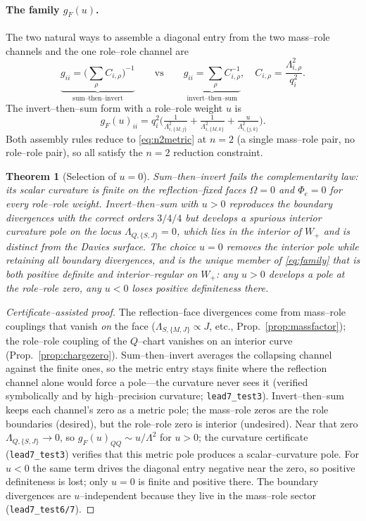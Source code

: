 \documentclass[11pt]{article}
\newtheorem{theorem}{Theorem}
\newcommand{\Wp}{W_{+}}
\begin{document}
\paragraph{The family $g_F(u)$.}
The two natural ways to assemble a diagonal entry from the two mass--role channels and the one
role--role channel are
\[
\underbrace{g_{ii}=\Big(\textstyle\sum_\rho C_{i,\rho}\Big)^{-1}}_{\text{sum--then--invert}}
\qquad\text{vs}\qquad
\underbrace{g_{ii}=\textstyle\sum_\rho C_{i,\rho}^{-1}}_{\text{invert--then--sum}},
\quad C_{i,\rho}=\frac{\Lambda_{i,\rho}^2}{q_i^2}.
\]
The invert--then--sum form with a role--role weight $u$ is
\begin{equation}
g_F(u)_{ii}=q_i^2\Big(\tfrac1{\Lambda_{i,\{M,j\}}^2}+\tfrac1{\Lambda_{i,\{M,k\}}^2}
+\tfrac{u}{\Lambda_{i,\{j,k\}}^2}\Big).
\label{eq:family}
\end{equation}
Both assembly rules reduce to \eqref{eq:n2metric} at $n=2$ (a single mass--role pair, no
role--role pair), so all satisfy the $n=2$ reduction constraint.

\begin{theorem}[Selection of $u=0$]
\label{thm:selection}
Sum--then--invert fails the complementarity law: its scalar curvature is finite on the
reflection--fixed faces $\Omega=0$ and $\Phi_e=0$ for every role--role weight.
Invert--then--sum with $u>0$ reproduces the boundary divergences with the correct orders
$3/4/4$ but develops a spurious interior curvature pole on the locus $\Lambda_{Q,\{S,J\}}=0$,
which lies in the interior of $\Wp$ and is distinct from the Davies surface. The choice $u=0$
removes the interior pole while retaining all boundary divergences, and is the unique member
of \eqref{eq:family} that is both positive definite and interior--regular on $\Wp$: any $u>0$
develops a pole at the role--role zero, any $u<0$ loses positive definiteness there.
\end{theorem}

\begin{proof}[Certificate--assisted proof]
The reflection--face divergences come from mass--role couplings that vanish \emph{on} the face
($\Lambda_{S,\{M,J\}}\propto J$, etc., Prop.~\ref{prop:massfactor}); the role--role coupling
of the $Q$--chart vanishes on an interior curve (Prop.~\ref{prop:chargezero}). Sum--then--invert
averages the collapsing channel against the finite ones, so the metric entry stays finite where
the reflection channel alone would force a pole---the curvature never sees it (verified
symbolically and by high--precision curvature; \texttt{lead7\_test3}). Invert--then--sum keeps
each channel's zero as a metric pole; the mass--role zeros are the role boundaries (desired),
but the role--role zero is interior (undesired). Near that zero
$\Lambda_{Q,\{S,J\}}\to0$, so $g_F(u)_{QQ}\sim u/\Lambda^2$ for $u>0$; the curvature certificate
(\texttt{lead7\_test3}) verifies that this metric pole produces a scalar--curvature pole. For
$u<0$ the same term drives the diagonal entry negative near the zero, so positive definiteness
is lost; only $u=0$ is finite and positive there. The boundary divergences are $u$--independent
because they live in the mass--role sector (\texttt{lead7\_test6/7}).
\end{proof}
\end{document}

